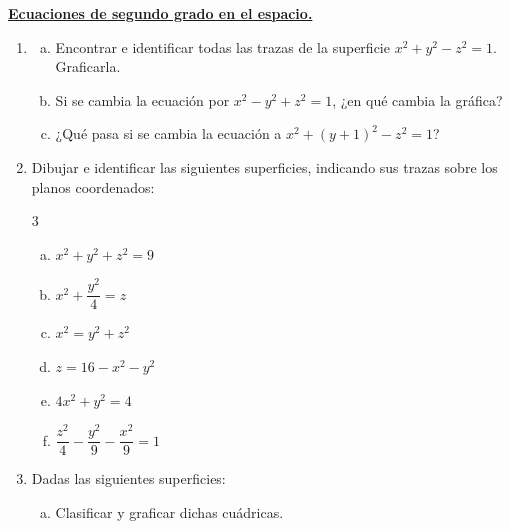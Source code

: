 \documentclass[11pt]{article}
\begin{document}
\underline{\bf \large{Ecuaciones de segundo grado en el espacio.}}
\begin{enumerate}[\hspace{-5mm}$1)$]

\item 
\begin{enumerate}[a)]
\item Encontrar e identificar todas las trazas de la superficie $x^2 + y^2 - z^2 = 1$. Graficarla.
\item Si se cambia la ecuación por $x^2 - y^2 + z^2 = 1$, ¿en qué cambia la gráfica?
\item ¿Qué pasa si se cambia la ecuación a $x^2 + (y + 1)^2 - z^2 = 1$?
\end{enumerate}











\item Dibujar e identificar las siguientes superficies, indicando sus trazas sobre los planos coordenados:
\begin{multicols}{3}
\begin{enumerate}[a)]
\item $x^2 + y^2 + z^2 = 9$
\item $x^2 + \dfrac{y^2}{4} = z$
\item $x^2 = y^2 + z^2$
\item $z = 16 - x^2 - y^2$
\item $4x^2 + y^2 = 4$
\item $\dfrac{z^2}{4} - \dfrac{y^2}{9} - \dfrac{x^2}{9} = 1$
\end{enumerate}
\end{multicols}

















\item Dadas las siguientes superficies:

\begin{enumerate}[a)]
    \item Clasificar y graficar dichas cuádricas.



\end{enumerate}
\end{enumerate}
\end{document}
